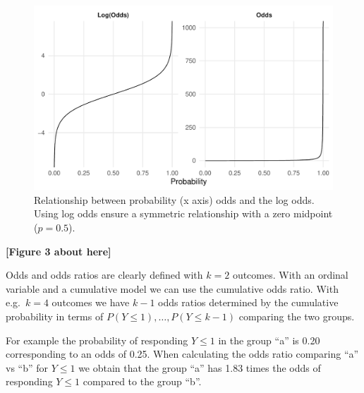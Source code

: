 \documentclass[
  man,floatsintext]{apa6}
\begin{document}
\scriptsize

\begin{figure}

{\centering \includegraphics[width=1\linewidth]{paper_files/figure-latex/fig-odds-example-1} 

}

\caption{Relationship between probability (x axis) odds and the log odds. Using log odds ensure a symmetric relationship with a zero midpoint (\(p = 0.5\)).}\label{fig:fig-odds-example}
\end{figure}

\begin{center}\textbf{[Figure 3 about here]} \end{center}

\normalsize

Odds and odds ratios are clearly defined with \(k = 2\) outcomes. With an ordinal variable and a cumulative model we can use the cumulative odds ratio. With e.g.~\(k = 4\) outcomes we have \(k - 1\) odds ratios determined by the cumulative probability in terms of \(P(Y \leq 1), \dots, P(Y \leq k - 1)\) comparing the two groups.

For example the probability of responding \(Y \leq 1\) in the group ``a'' is 0.20 corresponding to an odds of 0.25. When calculating the odds ratio comparing ``a'' vs ``b'' for \(Y \leq 1\) we obtain that the group ``a'' has 1.83 times the odds of responding \(Y \leq 1\) compared to the group ``b''.

\scriptsize
\end{document}
